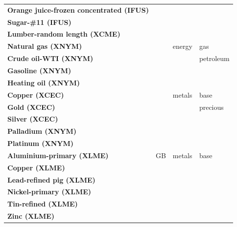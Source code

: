 \documentclass[
  authoryear,
  preprint,
  3p]{elsarticle}
\begin{document}
\begin{longtable}[t]{>{}l>{}l>{}l>{}l}
\textbf{Orange juice-frozen concentrated (IFUS)} & \textcolor[HTML]{4285f4}{} & \textcolor[HTML]{4285f4}{} & \textcolor[HTML]{4285f4}{}\\
\textbf{Sugar-\#11 (IFUS)} & \textcolor[HTML]{4285f4}{} & \textcolor[HTML]{4285f4}{} & \textcolor[HTML]{4285f4}{}\\
\textbf{Lumber-random length (XCME)} & \textcolor[HTML]{4285f4}{} & \textcolor[HTML]{4285f4}{} & \textcolor[HTML]{4285f4}{}\\
\addlinespace
\textbf{Natural gas (XNYM)} & \textcolor[HTML]{4285f4}{} & \textcolor[HTML]{4285f4}{energy} & \textcolor[HTML]{4285f4}{gas}\\
\textbf{Crude oil-WTI (XNYM)} & \textcolor[HTML]{4285f4}{} & \textcolor[HTML]{4285f4}{} & \textcolor[HTML]{4285f4}{petroleum}\\
\textbf{Gasoline (XNYM)} & \textcolor[HTML]{4285f4}{} & \textcolor[HTML]{4285f4}{} & \textcolor[HTML]{4285f4}{}\\
\textbf{Heating oil (XNYM)} & \textcolor[HTML]{4285f4}{} & \textcolor[HTML]{4285f4}{} & \textcolor[HTML]{4285f4}{}\\
\textbf{Copper (XCEC)} & \textcolor[HTML]{4285f4}{} & \textcolor[HTML]{4285f4}{metals} & \textcolor[HTML]{4285f4}{base}\\
\addlinespace
\textbf{Gold (XCEC)} & \textcolor[HTML]{4285f4}{} & \textcolor[HTML]{4285f4}{} & \textcolor[HTML]{4285f4}{precious}\\
\textbf{Silver (XCEC)} & \textcolor[HTML]{4285f4}{} & \textcolor[HTML]{4285f4}{} & \textcolor[HTML]{4285f4}{}\\
\textbf{Palladium (XNYM)} & \textcolor[HTML]{4285f4}{} & \textcolor[HTML]{4285f4}{} & \textcolor[HTML]{4285f4}{}\\
\textbf{Platinum (XNYM)} & \textcolor[HTML]{4285f4}{} & \textcolor[HTML]{4285f4}{} & \textcolor[HTML]{4285f4}{}\\
\textbf{Aluminium-primary (XLME)} & \textcolor[HTML]{4285f4}{GB} & \textcolor[HTML]{4285f4}{metals} & \textcolor[HTML]{4285f4}{base}\\
\addlinespace
\textbf{Copper (XLME)} & \textcolor[HTML]{4285f4}{} & \textcolor[HTML]{4285f4}{} & \textcolor[HTML]{4285f4}{}\\
\textbf{Lead-refined pig (XLME)} & \textcolor[HTML]{4285f4}{} & \textcolor[HTML]{4285f4}{} & \textcolor[HTML]{4285f4}{}\\
\textbf{Nickel-primary (XLME)} & \textcolor[HTML]{4285f4}{} & \textcolor[HTML]{4285f4}{} & \textcolor[HTML]{4285f4}{}\\
\textbf{Tin-refined (XLME)} & \textcolor[HTML]{4285f4}{} & \textcolor[HTML]{4285f4}{} & \textcolor[HTML]{4285f4}{}\\
\textbf{Zinc (XLME)} & \textcolor[HTML]{4285f4}{} & \textcolor[HTML]{4285f4}{} & \textcolor[HTML]{4285f4}{}\\
\bottomrule

\end{longtable}

\endgroup{}

\newpage


\renewcommand\refname{References}
  
\end{document}
